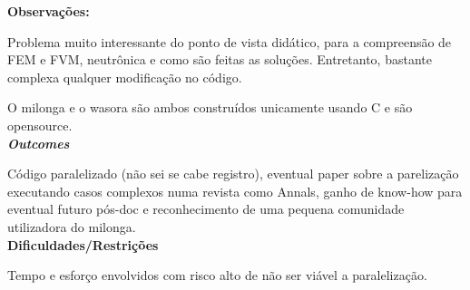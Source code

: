 \textbf{Observações:}

Problema muito interessante do ponto de vista didático, para a compreensão 
de FEM e FVM, neutrônica e como são feitas as soluções. Entretanto, bastante 
complexa qualquer modificação no código.

O milonga e o wasora são ambos construídos unicamente usando C e são opensource.\\

\textbf{\textit{Outcomes}}

Código paralelizado (não sei se cabe registro), eventual paper sobre a parelização 
executando casos complexos numa revista como Annals, ganho de know-how para eventual futuro pós-doc e reconhecimento de uma pequena comunidade utilizadora 
do milonga.\\

\textbf{Dificuldades/Restrições}

Tempo e esforço envolvidos com risco alto de não ser viável a paralelização.
